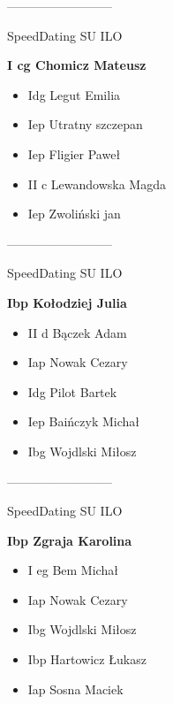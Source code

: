 \documentclass[a4paper,10pt]{article}
\begin{document}
\begin{multicols}{3}
\begin{minipage}[l]{\textwidth}
\begin{itemize}
    \end{itemize}



\end{minipage}



\begin{minipage}[l]{\textwidth}
--------------------------

  \footnotesize{SpeedDating SU ILO}

  \bfseries{I cg Chomicz Mateusz}

  \begin{itemize}
    \item Idg Legut Emilia
    \item Iep Utratny szczepan
    \item Iep Fligier Paweł
    \item II c Lewandowska Magda
    \item Iep Zwoliński jan

    \end{itemize}



\end{minipage}



\begin{minipage}[l]{\textwidth}
--------------------------

  \footnotesize{SpeedDating SU ILO}

  \bfseries{Ibp Kołodziej Julia}

  \begin{itemize}
    \item II d Bączek Adam
    \item Iap Nowak Cezary
    \item Idg Pilot Bartek
    \item Iep Baińczyk Michał
    \item Ibg Wojdlski Miłosz

    \end{itemize}



\end{minipage}



\begin{minipage}[l]{\textwidth}
--------------------------

  \footnotesize{SpeedDating SU ILO}

  \bfseries{Ibp Zgraja Karolina}

  \begin{itemize}
    \item I eg Bem Michał
    \item Iap Nowak Cezary
    \item Ibg Wojdlski Miłosz
    \item Ibp Hartowicz Łukasz
    \item Iap Sosna Maciek


\end{itemize}
\end{minipage}
\end{multicols}
\end{document}
